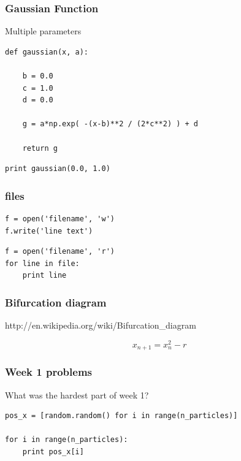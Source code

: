 \begin{frame}[fragile]

    \frametitle{Gaussian Function}

    Multiple parameters

    \bigskip

\begin{lstlisting}
def gaussian(x, a):

    b = 0.0
    c = 1.0
    d = 0.0

    g = a*np.exp( -(x-b)**2 / (2*c**2) ) + d

    return g
\end{lstlisting}

\begin{lstlisting}
print gaussian(0.0, 1.0)
\end{lstlisting}

\end{frame}

\begin{frame}[fragile]

    \frametitle{files}

\begin{lstlisting}
f = open('filename', 'w')
f.write('line text')
\end{lstlisting}

\begin{lstlisting}
f = open('filename', 'r')
for line in file:
    print line
\end{lstlisting}

\end{frame}


\begin{frame}[fragile]

    \frametitle{Bifurcation diagram}

    http://en.wikipedia.org/wiki/Bifurcation\_diagram

    \bigskip

    \begin{equation*}
        x_{n+1} = x_n^2 - r
    \end{equation*}

\end{frame}


\begin{frame}[fragile]

    \frametitle{Week 1 problems}

    What was the hardest part of week 1?\\

    \bigskip

\begin{lstlisting}
pos_x = [random.random() for i in range(n_particles)]

for i in range(n_particles):
    print pos_x[i]

\end{lstlisting}


\end{frame}




